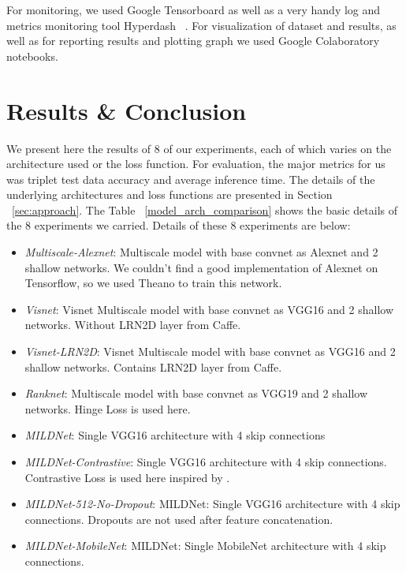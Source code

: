 \documentclass[10pt,twocolumn,letterpaper]{article}
\begin{document}
For monitoring, we used Google Tensorboard as well as a very handy log and metrics monitoring tool Hyperdash ~\cite{c37}. For visualization of dataset and results, as well as for reporting results and plotting graph we used Google Colaboratory notebooks.

\section{Results \& Conclusion}We present here the results of 8 of our experiments, each of which varies on the architecture used or the loss function. For evaluation, the major metrics for us was triplet test data accuracy and average inference time. The details of the underlying architectures and loss functions are presented in Section ~\ref{sec:approach}. The Table ~\ref{model_arch_comparison} shows the basic details of the 8 experiments we carried. Details of these 8 experiments are below:
\vspace{-2mm}
\begin{itemize}
\itemsep-0.2em
\item \textit{Multiscale-Alexnet}: Multiscale model with base convnet as Alexnet and 2 shallow networks. We couldn't find a good implementation of Alexnet on Tensorflow, so we used Theano to train this network.
\item \textit{Visnet}: Visnet Multiscale model with base convnet as VGG16 and 2 shallow networks. Without LRN2D layer from Caffe.
\item \textit{Visnet-LRN2D}: Visnet Multiscale model with base convnet as VGG16 and 2 shallow networks. Contains LRN2D layer from Caffe.
\item \textit{Ranknet}: Multiscale model with base convnet as VGG19 and 2 shallow networks. Hinge Loss is used here.
\item \textit{MILDNet}: Single VGG16 architecture with 4 skip connections
\item \textit{MILDNet-Contrastive}: Single VGG16 architecture with 4 skip connections. Contrastive Loss is used here inspired by \cite{c3}.
\item \textit{MILDNet-512-No-Dropout}: MILDNet: Single VGG16 architecture with 4 skip connections. Dropouts are not used after feature concatenation.
\item \textit{MILDNet-MobileNet}: MILDNet: Single MobileNet architecture with 4 skip connections.
\end{itemize}
\end{document}
